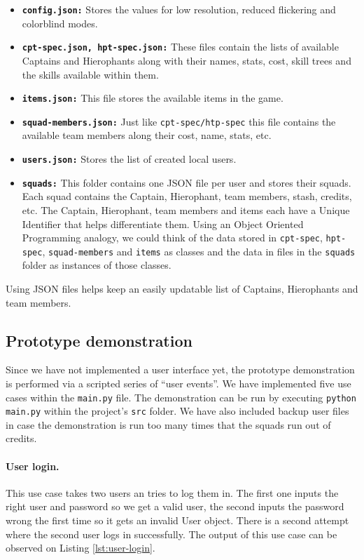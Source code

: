 \documentclass{article}
\begin{document}
\begin{itemize}
	\item \texttt{\textbf{config.json:}} Stores the values for low resolution, reduced flickering and colorblind modes.
	\item \texttt{\textbf{cpt-spec.json, hpt-spec.json:}} These files contain the lists of available Captains and Hierophants along with their names, stats, cost, skill trees and the skills available within them.
	\item \texttt{\textbf{items.json:}} This file stores the available items in the game.
	\item \texttt{\textbf{squad-members.json:}} Just like \texttt{cpt-spec/htp-spec} this file contains the available team members along their cost, name, stats, etc.
	\item \texttt{\textbf{users.json:}} Stores the list of created local users.
	\item \texttt{\textbf{squads:}} This folder contains one JSON file per user and stores their squads. Each squad contains the Captain, Hierophant, team members, stash, credits, etc. The Captain, Hierophant, team members and items each have a Unique Identifier that helps differentiate them. Using an Object Oriented Programming analogy, we could think of the data stored in \texttt{cpt-spec}, \texttt{hpt-spec}, \texttt{squad-members} and \texttt{items} as classes and the data in files in the \texttt{squads} folder as instances of those classes.
\end{itemize}

Using JSON files helps keep an easily updatable list of Captains, Hierophants and team members.

\subsection*{Prototype demonstration}
Since we have not implemented a user interface yet, the prototype demonstration is performed via a scripted series of ``user events''. We have implemented five use cases within the \texttt{main.py} file. The demonstration can be run by executing \texttt{python main.py} within the project's \texttt{src} folder. We have also included backup user files in case the demonstration is run too many times that the squads run out of credits.

\paragraph{User login.} This use case takes two users an tries to log them in. The first one inputs the right user and password so we get a valid user, the second inputs the password wrong the first time so it gets an invalid User object. There is a second attempt where the second user logs in successfully. The output of this use case can be observed on Listing \ref{lst:user-login}.
\end{document}
